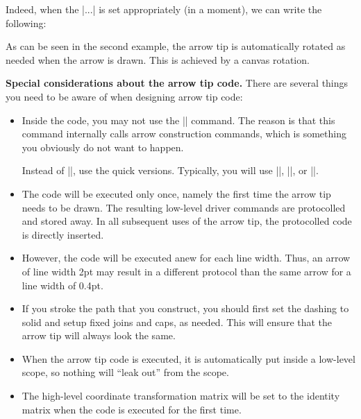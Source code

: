 \begin{command}{\pgfarrowsdeclare{}}
  Indeed, when the |...| is set appropriately (in a moment), we can
  write the following:
{
  \pgfsetdash{}{0pt} %
  \pgfsetroundjoin   %
  \pgfsetroundcap    %
  \pgfpathmoveto{\pgfpoint{-10pt}{10pt}}
  \pgfusepathqstroke
}
\begin{codeexample}[]
\end{codeexample}

  As can be seen in the second example, the arrow tip is automatically
  rotated as needed when the arrow is drawn. This is achieved by a
  canvas rotation.

  \medskip
  \textbf{Special considerations about the arrow tip code.}
  There are several things you need to be aware of when designing
  arrow tip code:
  \begin{itemize}
  \item
    Inside the code, you may not use the |\pgfusepath|
    command. The reason is that this command internally calls arrow
    construction commands, which is something you obviously do not want
    to happen.

    Instead of |\pgfusepath|, use the quick versions. Typically, you
    will use |\pgfusepathqstroke|, |\pgfusepathqfill|, or
    |\pgfusepathqfillstroke|.
  \item
    The code will be executed only once, namely the first time the
    arrow tip needs to be drawn. The resulting low-level driver
    commands are protocolled and stored away. In all subsequent
    uses of the arrow tip, the protocolled code is directly inserted.
  \item
    However, the code will be executed anew for each line width. Thus,
    an arrow of line width 2pt may result in a different protocol than
    the same arrow for a line width of 0.4pt.
  \item
    If you stroke the path that you construct, you should first set
    the dashing to solid and setup fixed joins and caps, as
    needed. This will ensure that the arrow tip will always look the
    same.
  \item
    When the arrow tip code is executed, it is automatically put
    inside a low-level scope, so nothing will ``leak out'' from the
    scope.
  \item
    The high-level coordinate transformation matrix will be set to the
    identity matrix when the code is executed for the first time.
  \end{itemize}


\end{command}
